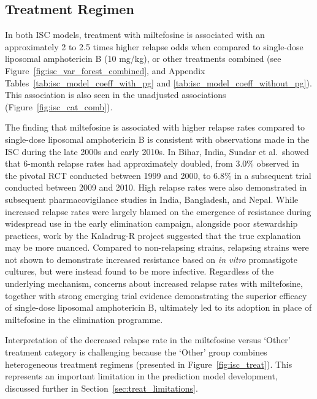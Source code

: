 \subsection{Treatment Regimen}

In both ISC models, treatment with miltefosine is associated with an approximately 2 to 2.5 times higher relapse odds when compared to single-dose liposomal amphotericin B (10 mg/kg), or other treatments combined (see Figure~\ref{fig:isc_var_forest_combined}, and Appendix Tables~\ref{tab:isc_model_coeff_with_pg} and \ref{tab:isc_model_coeff_without_pg}). This association is also seen in the unadjusted associations (Figure~\ref{fig:isc_cat_comb}).

The finding that miltefosine is associated with higher relapse rates compared to single-dose liposomal amphotericin B is consistent with observations made in the ISC during the late 2000s and early 2010s. In Bihar, India, Sundar et al.\ showed that 6-month relapse rates had approximately doubled, from 3.0\% observed in the pivotal RCT conducted between 1999 and 2000\cite{sundar2002}, to 6.8\% in a subsequent trial conducted between 2009 and 2010\cite{sundar2012}. High relapse rates were also demonstrated in subsequent pharmacovigilance studies in India\cite{pandey2016}, Bangladesh\cite{rahman2011}, and Nepal\cite{rijal2013}. While increased relapse rates were largely blamed on the emergence of resistance during widespread use in the early elimination campaign, alongside poor stewardship practices\cite{sundarEfficacyMiltefosineTreatment2012}, work by the Kaladrug-R project suggested that the true explanation may be more nuanced. Compared to non-relapsing strains, relapsing strains were not shown to demonstrate increased resistance based on \textit{in vitro} promastigote cultures, but were instead found to be more infective\cite{rai2013}. Regardless of the underlying mechanism, concerns about increased relapse rates with miltefosine, together with strong emerging trial evidence demonstrating the superior efficacy of single-dose liposomal amphotericin B, ultimately led to its adoption in place of miltefosine in the elimination programme\cite{WHO_KalaAzarElimination_2015}.

Interpretation of the decreased relapse rate in the miltefosine versus `Other' treatment category is challenging because the `Other' group combines heterogeneous treatment regimens (presented in Figure~\ref{fig:isc_treat}). This represents an important limitation in the prediction model development, discussed further in Section~\ref{sec:treat_limitations}.

